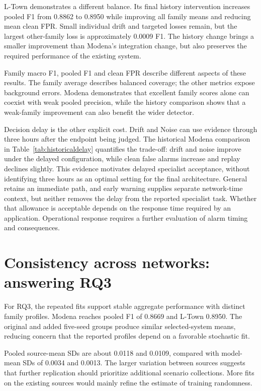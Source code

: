 L-Town demonstrates a different balance. Its final history intervention increases pooled F1 from 0.8862 to 0.8950 while improving all family means and reducing mean clean FPR. Small individual drift and targeted losses remain, but the largest other-family loss is approximately 0.0009 F1. The history change brings a smaller improvement than Modena's integration change, but also preserves the required performance of the existing system.

Family macro F1, pooled F1 and clean FPR describe different aspects of these results. The family average describes balanced coverage; the other metrics expose background errors. Modena demonstrates that excellent family scores alone can coexist with weak pooled precision, while the history comparison shows that a weak-family improvement can also benefit the wider detector.

Decision delay is the other explicit cost. Drift and Noise can use evidence through three hours after the endpoint being judged. The historical Modena comparison in Table~\ref{tab:historicaldelay} quantifies the trade-off: drift and noise improve under the delayed configuration, while clean false alarms increase and replay declines slightly. This evidence motivates delayed specialist acceptance, without identifying three hours as an optimal setting for the final architecture. General retains an immediate path, and early warning supplies separate network-time context, but neither removes the delay from the reported specialist task. Whether that allowance is acceptable depends on the response time required by an application. Operational response requires a further evaluation of alarm timing and consequences.

\section{Consistency across networks: answering RQ3}
For RQ3, the repeated fits support stable aggregate performance with distinct family profiles. Modena reaches pooled F1 of 0.8669 and L-Town 0.8950. The original and added five-seed groups produce similar selected-system means, reducing concern that the reported profiles depend on a favorable stochastic fit.

Pooled source-mean SDs are about 0.0118 and 0.0109, compared with model-mean SDs of 0.0034 and 0.0013. The larger variation between sources suggests that further replication should prioritize additional scenario collections. More fits on the existing sources would mainly refine the estimate of training randomness.

